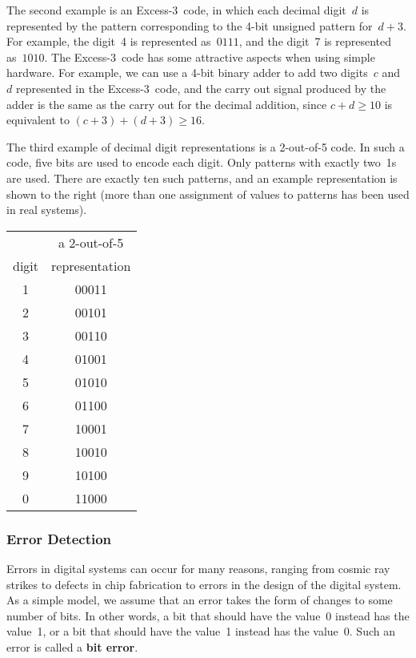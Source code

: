 \begin{minipage}{4.75in}
The second example is an \mbox{Excess-3}~code, in which each decimal
digit~$d$ is represented by the pattern corresponding to the 
\mbox{4-bit} unsigned pattern for~$d+3$.  For example, the digit~4
is represented as~$0111$, and the digit~7 is represented as~$1010$.
The \mbox{Excess-3}~code has some attractive aspects when using 
simple hardware.  For example, we can use a \mbox{4-bit} binary 
adder to add two digits~$c$ and~$d$ represented in the \mbox{Excess-3}~code, 
and the carry out signal produced by the adder is the same as the carry
out for the decimal addition, since $c+d\geq{10}$ is equivalent to 
$(c+3)+(d+3)\geq{16}$.\mpline

The third example of decimal digit representations is a \mbox{2-out-of-5}
code.  In such a code, five bits are used to encode each digit.  
%
Only patterns with exactly two~1s are used.  There are exactly ten 
such patterns, and an example representation is shown to the right (more
than one assignment of values to patterns has been used in real systems).\\
\end{minipage}\hspace{.25in}%
\begin{minipage}{1.5in}
\begin{tabular}{c|c}
& a 2-out-of-5\\
digit& representation\\ \hline
1& 00011\\
2& 00101\\
3& 00110\\
4& 01001\\
5& 01010\\
6& 01100\\
7& 10001\\
8& 10010\\
9& 10100\\
0& 11000\\
\end{tabular}
\end{minipage}



\subsubsection{Error Detection}

Errors in digital systems
can occur for many reasons, ranging from cosmic ray strikes to
defects in chip fabrication to errors in the design of the digital system.
%
As a simple model, we assume that an error takes the form of changes to
some number of bits.  In other words, a bit that should have the value~0
instead has the value~1, or a bit that should have the value~1 instead
has the value~0.  Such an error is called a {\bf bit error}.

